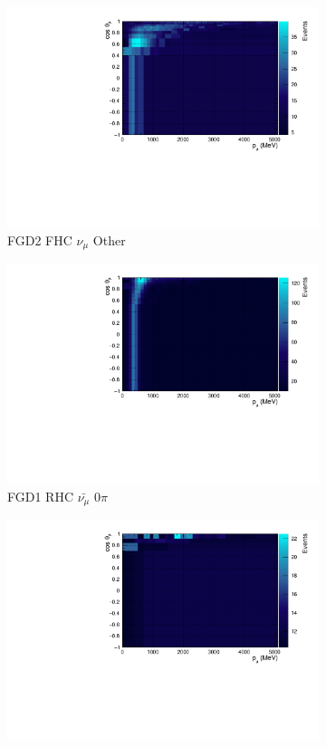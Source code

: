 \begin{figure}
\begin{subfigure}{.32\textwidth}
  \includegraphics[width=0.95\linewidth]{figs/TH2Poly_MC_FGD2_numuCC_other}
  \caption{FGD2 FHC $\nu_{\mu}$ Other}
  \label{fig:th2polyFGD2_numuCC_other}
\end{subfigure}
\centering
\begin{subfigure}{.32\textwidth}
  \centering
  \includegraphics[width=0.95\linewidth]{figs/TH2Poly_MC_FGD1_anti-numuCC_0pi}
  \caption{FGD1 RHC $\bar{\nu_{\mu}}$ 0$\pi$}
  \label{fig:th2polyFGD1_anti-numuCC_0pi}
\end{subfigure}
\begin{subfigure}{.32\textwidth}
  \centering
  \includegraphics[width=0.95\linewidth]{figs/TH2Poly_MC_FGD1_anti-numuCC_1pi}

\end{subfigure}
\end{figure}
